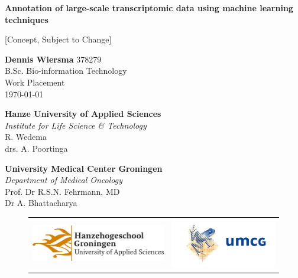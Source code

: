 \begin{titlepage}
    \begin{center}
        \textbf{\LARGE Annotation of large-scale transcriptomic data using machine learning techniques}

        \vspace{0.2cm}
        \normalsize [Concept, Subject to Change]

        \vspace{1.5cm}

    \end{center}

    \vfill

    \begin{flushright}
        \textbf{Dennis Wiersma} 378279 \\
        B.Sc. Bio-information Technology \\
        Work Placement \\
        \longdate
        \today

        \vspace{1cm}


        \textbf{Hanze University of Applied Sciences} \\
        \textit{Institute for Life Science \& Technology} \\
        R. Wedema \\
        drs. A. Poortinga

        \textbf{University Medical Center Groningen} \\
        \textit{Department of Medical Oncology} \\
        Prof. Dr R.S.N. Fehrmann, MD \\
        Dr A. Bhattacharya

        \begin{figure}[b]
            \begin{tabular}{ll}
                \centering
                \includegraphics[scale=0.05]{images/logos/hanze}
                &
                \includegraphics[scale=0.1]{images/logos/umcg}
            \end{tabular}
        \end{figure}

    \end{flushright}
\end{titlepage}
